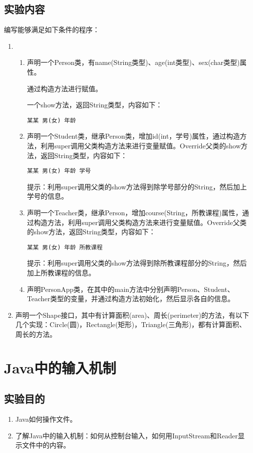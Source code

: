 ﻿\documentclass[cs5size,b5paper,nofonts,twoside]{ctexart}
\begin{document}
\subsection{实验内容}
编写能够满足如下条件的程序：
\begin{enumerate}
\item
\begin{enumerate}
\item 声明一个Person类，有name(String类型)、age(int类型)、sex(char类型)属性。

      通过构造方法进行赋值。
	  
      一个show方法，返回String类型，内容如下：
         \begin{verbatim}某某 男(女) 年龄\end{verbatim}
\item 声明一个Student类，继承Person类，增加id(int，学号)属性，通过构造方法，利用super调用父类构造方法来进行变量赋值。Override父类的show方法，返回String类型，内容如下：
         \begin{verbatim}某某 男(女) 年龄 学号\end{verbatim}
提示：利用super调用父类的show方法得到除学号部分的String，然后加上学号的信息。
\item 声明一个Teacher类，继承Person，增加course(String，所教课程)属性，通过构造方法，利用super调用父类构造方法来进行变量赋值。Override父类的show方法，返回String类型，内容如下：
      \begin{verbatim}某某 男(女) 年龄 所教课程\end{verbatim}
提示：利用super调用父类的show方法得到除所教课程部分的String，然后加上所教课程的信息。
\item 声明PersonApp类，在其中的main方法中分别声明Person、Student、Teacher类型的变量，并通过构造方法初始化，然后显示各自的信息。
\end{enumerate}
\item 声明一个Shape接口，其中有计算面积(area)、周长(perimeter)的方法，有以下几个实现：Circle(圆)，Rectangle(矩形)，Triangle(三角形)，都有计算面积、周长的方法。
\end{enumerate}

\clearpage
\section{Java中的输入机制}
\subsection{实验目的}
\begin{enumerate}
\item Java如何操作文件。
\item 了解Java中的输入机制：如何从控制台输入，如何用InputStream和Reader显示文件中的内容。
\end{enumerate}
\end{document}
